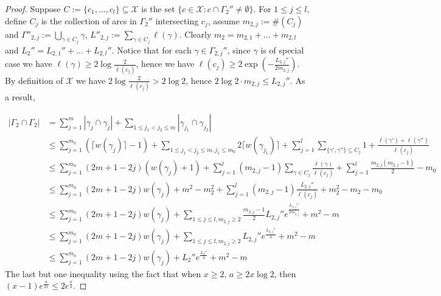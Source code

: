 \documentclass[11pt, a4paper]{article}
\theoremstyle{definition}
\theoremstyle{remark}
\newcommand{\calx}{\mathcal{X}}
\newcommand{\abs}[1]{\left| #1 \right|}
\begin{document}
\begin{proof}

Suppose $C:=\{c_1,...,c_l\}\subseteq\calx$ is the set $\{c\in\calx:c\cap\Gamma_2''\neq\emptyset\}$. For $1\leqslant j\leqslant l$, define $C_j$ is the collection of arcs in $\Gamma_2''$ intersecting $c_j$, assume $m_{2,j}:=\#(C_j)$ and $\Gamma''_{2,j}:=\bigcup_{\gamma\in C_j}\gamma$, $L''_{2,j}:=\sum_{\gamma\in C_j}\ell(\gamma)$. Clearly $m_2=m_{2,1}+...+m_{2,l}$ and $L_2''=L_{2,1}''+...+L_{2,l}''$. Notice that for each $\gamma\in\Gamma_{2,j}''$, since $\gamma$ is of special case we have $\ell(\gamma)\geqslant2\log\frac2{\ell(c_j)}$, hence we have $\ell(c_j)\geqslant2\exp(-{\frac{L_{2,j}''}{2m_{2,j}}})$. By definition of $\calx$ we have $2\log\frac2{\ell(c_j)}>2\log2$, hence $2\log2\cdot{m_{2,j}}\leqslant L_{2,j}''$. As a result,


\begin{align*}
  \abs{\Gamma_2\cap\Gamma_2}&=\sum_{j=1}^{m}\abs{\gamma_j\cap\gamma_j}+\sum_{1\leqslant j_1<j_2\leqslant m}\abs{\gamma_{j_1}\cap\gamma_{j_2}}\\
&\leqslant\sum_{j=1}^{m_0}(\lceil{w(\gamma_j)}\rceil-1)+\sum_{1\leqslant j_1<j_2\leqslant m, j_1\leqslant m_0}2\lceil{w(\gamma_{j_1})}\rceil
+\sum_{j=1}^{l}\sum_{\{\gamma',\gamma''\}\subseteq C_j}1+\frac{\ell(\gamma')+\ell(\gamma'')}{\ell(c_j)}\\
&\leqslant\sum_{j=1}^{m_0}(2m+1-2j)(w(\gamma_j)+1)+\sum_{j=1}^{l}(m_{2,j}-1)\sum_{\gamma\in C_j}\frac{\ell(\gamma)}{\ell(c_j)}+\sum_{j=1}^{l}\frac{m_{2,j}(m_{2,j}-1)}2-m_0\\
&\leqslant\sum_{j=1}^{m_0}(2m+1-2j)w(\gamma_j)+m^2-m_2^2+\sum_{j=1}^{l}(m_{2,j}-1)\frac{L_{2,j}''}{\ell(c_j)}+m_2^2-m_2-m_0\\
&\leqslant\sum_{j=1}^{m_0}(2m+1-2j)w(\gamma_j)+\sum_{1\leqslant j\leqslant l, m_{2,j}\geqslant2}\frac{m_{2,j}-1}2L_{2,j}''e^{\frac{L_{2,j}''}{2m_{2,j}}}+m^2-m\\
&\leqslant\sum_{j=1}^{m_0}(2m+1-2j)w(\gamma_j)+\sum_{1\leqslant j\leqslant l, m_{2,j}\geqslant2}L_{2,j}''e^{\frac{L_{2,j}''}{4}}+m^2-m\\
&\leqslant\sum_{j=1}^{m_0}(2m+1-2j)w(\gamma_j)+{L_2''}e^{\frac{L_2''}4}+m^2-m
\end{align*}
The last but one inequality using the fact that when $x\geqslant2$, $a\geqslant 2x\log2$, then $(x-1)e^{\frac{a}{2x}}\leqslant2e^{\frac{a}4}$.
\end{proof}
\end{document}
